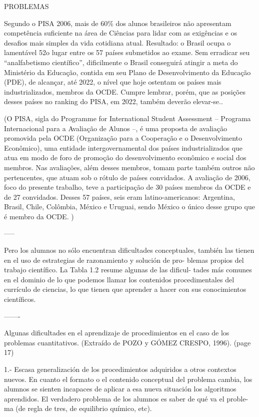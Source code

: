 PROBLEMAS

Segundo o PISA 2006, mais de 60\% dos alunos brasileiros não apresentam competência suficiente na área de Ciências para lidar com as exigências e os desafios mais simples da vida cotidiana atual. Resultado: o Brasil ocupa o lamentável 52o lugar entre os 57 países submetidos ao exame. Sem erradicar seu “analfabetismo científico”, dificilmente o Brasil conseguirá atingir a meta do Ministério da Educação, contida em seu Plano de Desenvolvimento da Educação (PDE), de alcançar, até 2022, o nível que hoje ostentam os países mais industrializados, membros da OCDE. Cumpre lembrar, porém, que as posições desses países no ranking do PISA, em 2022, também deverão elevar-se.. 


(O PISA, sigla do Programme for International Student Assessment – Programa Internacional para a Avaliação de Alunos –, é uma proposta de avaliação promovida pela OCDE (Organização para a Cooperação e o Desenvolvimento Econômico), uma entidade intergovernamental dos países industrializados que atua em modo de foro de promoção do desenvolvimento econômico e social dos membros. Nas avaliações, além desses membros, tomam parte também outros não pertencentes, que atuam sob o rótulo de países convidados. A avaliação de 2006, foco do presente trabalho, teve a participação de 30 países membros da OCDE e de 27 convidados. Desses 57 países, seis eram latino-americanos: Argentina, Brasil, Chile, Colômbia, México e Uruguai, sendo México o único desse grupo que é membro da OCDE. )

-----

Pero los alumnos no sólo encuentran dificultades conceptuales, también las tienen en el uso de estrategias de razonamiento y solución de pro- blemas propios del trabajo científico. La Tabla 1.2 resume algunas de las dificul- tades más comunes en el dominio de lo que podemos llamar los contenidos procedimentales del currículo de ciencias, lo que tienen que aprender a hacer con sus conocimientos científicos.

-------

Algunas dificultades en el aprendizaje de procedimientos en el caso de los problemas cuantitativos. (Extraído de POZO y GÓMEZ CRESPO, 1996). (page 17)

1.- Escasa generalización de los procedimientos adquiridos a otros contextos nuevos. En cuanto el formato o el contenido conceptual del problema cambia, los alumnos se sienten incapaces de aplicar a esa nueva situación los algoritmos aprendidos. El verdadero problema de los alumnos es saber de qué va el proble- ma (de regla de tres, de equilibrio químico, etc).

